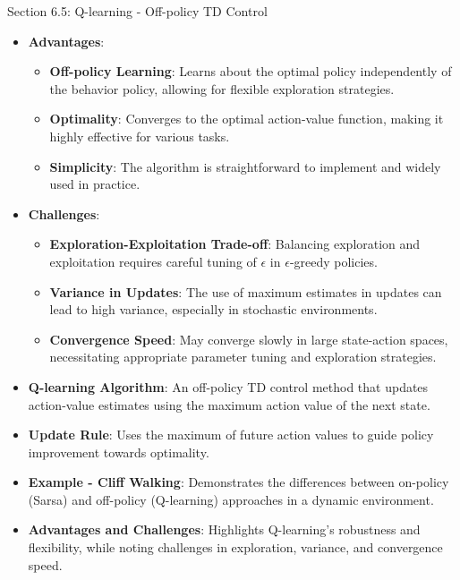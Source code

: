 \begin{notes}{Section 6.5: Q-learning - Off-policy TD Control}
\begin{highlight}
        \begin{itemize}
            \item \textbf{Advantages}:
                \begin{itemize}
                    \item \textbf{Off-policy Learning}: Learns about the optimal policy independently of the behavior policy, allowing for flexible exploration strategies.
                    \item \textbf{Optimality}: Converges to the optimal action-value function, making it highly effective for various tasks.
                    \item \textbf{Simplicity}: The algorithm is straightforward to implement and widely used in practice.
                \end{itemize}
            \item \textbf{Challenges}:
                \begin{itemize}
                    \item \textbf{Exploration-Exploitation Trade-off}: Balancing exploration and exploitation requires careful tuning of $\epsilon$ in $\epsilon$-greedy policies.
                    \item \textbf{Variance in Updates}: The use of maximum estimates in updates can lead to high variance, especially in stochastic environments.
                    \item \textbf{Convergence Speed}: May converge slowly in large state-action spaces, necessitating appropriate parameter tuning and exploration strategies.
                \end{itemize}
        \end{itemize}
    
    \end{highlight}
    
    \begin{highlight}
    
        \begin{itemize}
            \item \textbf{Q-learning Algorithm}: An off-policy TD control method that updates action-value estimates using the maximum action value of the next state.
            \item \textbf{Update Rule}: Uses the maximum of future action values to guide policy improvement towards optimality.
            \item \textbf{Example - Cliff Walking}: Demonstrates the differences between on-policy (Sarsa) and off-policy (Q-learning) approaches in a dynamic environment.
            \item \textbf{Advantages and Challenges}: Highlights Q-learning's robustness and flexibility, while noting challenges in exploration, variance, and convergence speed.
        \end{itemize}
    

\end{highlight}
\end{notes}
